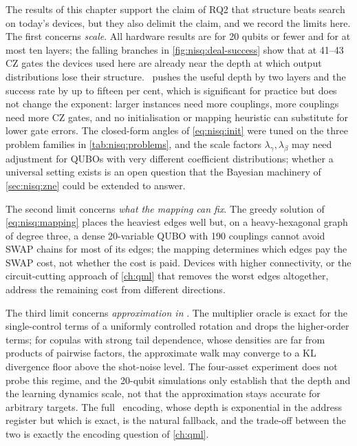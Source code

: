 The results of this chapter support the claim of RQ2 that structure beats search on today's devices, but they also delimit the claim, and we record the limits here. The first concerns \emph{scale}. All hardware results are for 20 qubits or fewer and for at most ten layers; the falling branches in \cref{fig:nisq:deal-success} show that at 41--43 CZ gates the devices used here are already near the depth at which output distributions lose their structure. \deal\ pushes the useful depth by two layers and the success rate by up to fifteen per cent, which is significant for practice but does not change the exponent: larger instances need more couplings, more couplings need more CZ gates, and no initialisation or mapping heuristic can substitute for lower gate errors. The closed-form angles of \cref{eq:nisq:init} were tuned on the three problem families in \cref{tab:nisq:problems}, and the scale factors $\lambda_{\gamma},\lambda_{\beta}$ may need adjustment for QUBOs with very different coefficient distributions; whether a universal setting exists is an open question that the Bayesian machinery of \cref{sec:nisq:zne} could be extended to answer.

The second limit concerns \emph{what the mapping can fix}. The greedy solution of \cref{eq:nisq:mapping} places the heaviest edges well but, on a heavy-hexagonal graph of degree three, a dense 20-variable QUBO with 190 couplings cannot avoid SWAP chains for most of its edges; the mapping determines which edges pay the SWAP cost, not whether the cost is paid. Devices with higher connectivity, or the circuit-cutting approach of \cref{ch:qml} that removes the worst edges altogether, address the remaining cost from different directions.

The third limit concerns \emph{approximation in \qawa}. The multiplier oracle is exact for the single-control terms of a uniformly controlled rotation and drops the higher-order terms; for copulas with strong tail dependence, whose densities are far from products of pairwise factors, the approximate walk may converge to a KL divergence floor above the shot-noise level. The four-asset experiment does not probe this regime, and the 20-qubit simulations only establish that the depth and the learning dynamics scale, not that the approximation stays accurate for arbitrary targets. The full \qcrank\ encoding, whose depth is exponential in the address register but which is exact, is the natural fallback, and the trade-off between the two is exactly the encoding question of \cref{ch:qml}.

